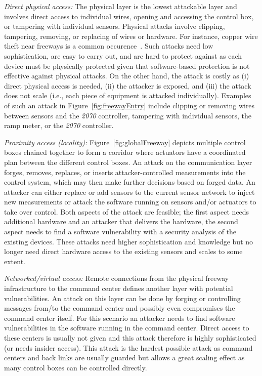     \emph{Direct physical access:}
    The physical layer is the lowest attackable layer and involves direct access to
    individual wires, opening and accessing the control box, or tampering with
    individual sensors. Physical attacks involve clipping, tampering, removing, or
    replacing of wires or hardware. For instance, copper wire theft near freeways is a common occurence~\cite{Sutton2014Custom,Rosenberg2014Custom}. Such attacks need low sophistication, are
    easy to carry out, and are hard to protect against as each device must be physically
    protected given that software-based protection is not effective against physical
    attacks. On the other hand, the attack is costly as (i) direct physical access
    is needed, (ii) the attacker is exposed, and (iii) the attack does not scale
    (i.e., each piece of equipment is attacked individually). Examples of such an
    attack in Figure~\ref{fig:freewayEntry} include clipping or removing wires
    between sensors and the \emph{2070} controller, tampering with individual sensors, the
    ramp meter, or the \emph{2070} controller.

\emph{Proximity access (locality):}
Figure~\ref{fig:globalFreeway} depicts multiple control boxes chained together to form a corridor
where actuators have a coordinated plan between the different control
boxes. An attack on the communication layer forges, removes, replaces, or
inserts attacker-controlled measurements into the control system, which may then make further decisions based on forged data. An attacker can either replace or add sensors to
the current sensor network to inject new measurements or attack the software
running on sensors and/or actuators to take over control. Both aspects of the
attack are feasible; the first aspect needs additional hardware and an attacker
that delivers the hardware, the second aspect needs to find a software
vulnerability with a security analysis of the existing devices. These attacks
need higher sophistication and knowledge but no longer need direct hardware
access to the existing sensors and scales to some extent.

\emph{Networked/virtual access:}
Remote connections from the physical freeway infrastructure to the command center defines another layer with potential vulnerabilities. An attack on this layer can be done by forging or controlling messages from/to the command center and
possibly even compromises the command center itself. For this scenario an
attacker needs to find software vulnerabilities in the software running in the
command center. Direct access to these centers is usually not given and this
attack therefore is highly sophisticated (or needs insider access). This attack
is the hardest possible attack as command centers and back links are usually
guarded but allows a great scaling effect as many control boxes can be
controlled directly.

